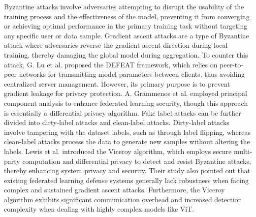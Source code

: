 \documentclass[conference]{IEEEtran}
\begin{document}
Byzantine attacks involve adversaries attempting to disrupt the usability of the training process and the effectiveness of the model, preventing it from converging or achieving optimal performance in the primary training task without targeting any specific user or data sample. Gradient ascent attacks are a type of Byzantine attack where adversaries reverse the gradient ascent direction during local training, thereby damaging the global model during aggregation\cite{gradientAscentAttack}. To counter this attack, G. Lu et al. proposed the DEFEAT framework\cite{gradientAscentAttack_privacy}, which relies on peer-to-peer networks for transmitting model parameters between clients, thus avoiding centralized server management. However, its primary purpose is to prevent gradient leakage for privacy protection. A. Grammenos et al. employed principal component analysis to enhance federated learning security\cite{federatedPCA}, though this approach is essentially a differential privacy algorithm. Fake label attacks can be further divided into dirty-label attacks\cite{latentAttack} and clean-label attacks\cite{cleanLabelAttack}. Dirty-label attacks involve tampering with the dataset labels, such as through label flipping\cite{tailAttack_SuchAsLabelFlip}, whereas clean-label attacks process the data to generate new samples without altering the labels. Lewis et al. introduced the Viceroy algorithm\cite{gradientAscentAttackAndLabelFlip}, which employs secure multi-party computation and differential privacy to detect and resist Byzantine attacks, thereby enhancing system privacy and security. Their study also pointed out that existing federated learning defense systems generally lack robustness when facing complex and sustained gradient ascent attacks. Furthermore, the Viceroy algorithm exhibits significant communication overhead and increased detection complexity when dealing with highly complex models like ViT\cite{MrZhou_MRFFL}.

\end{document}
